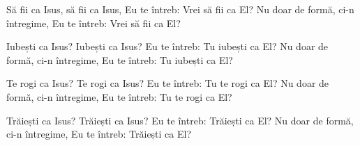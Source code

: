 \beginverse
Să fii ca Isus, să fii ca Isus,
Eu te întreb: Vrei să fii ca El?
Nu doar de formă, ci-n întregime,
Eu te întreb: Vrei să fii ca El?
\endverse

\beginverse
Iubești ca Isus? Iubești ca Isus?
Eu te întreb: Tu iubești ca El?
Nu doar de formă, ci-n întregime,
Eu te întreb: Tu iubești ca El?
\endverse

\beginverse
Te rogi ca Isus? Te rogi ca Isus?
Eu te întreb: Tu te rogi ca El?
Nu doar de formă, ci-n întregime,
Eu te întreb: Tu te rogi ca El?
\endverse

\beginverse
Trăiești ca Isus? Trăiești ca Isus?
Eu te întreb: Trăiești ca El?
Nu doar de formă, ci-n întregime,
Eu te întreb: Trăiești ca El?
\endverse
\endsong